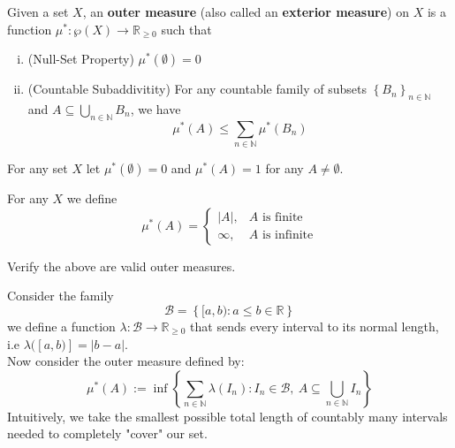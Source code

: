 \documentclass[11pt,x11names]{article}
\newcommand{\nn}{\mathbb{N}}
\newcommand{\rr}{\mathbb{R}}
\newcommand{\calb}{\mathcal{B}}
\newcommand{\set}[1]{\left\{ #1 \right\}}
\newcommand{\abs}[1]{\left| #1 \right|}
\begin{document}
\begin{defn}
Given a set $X$, an \textbf{outer measure} (also called an \textbf{exterior measure}) on $X$ is a function $\mu^*: \wp(X) \to \rr_{\geq 0}$ such that 
\begin{enumerate}[(i)]
    \item (Null-Set Property) $\mu^*(\emptyset) = 0$
    \item (Countable Subaddivitity) For any countable family of subsets $\set{B_n}_{n \in \nn}$ and $A \subseteq \bigcup_{n \in \nn} B_n$, we have
    \begin{equation*}
        \mu^*(A) \leq \sum_{n \in \nn} \mu^*(B_n)
    \end{equation*}
\end{enumerate}
\end{defn}

\begin{example}
For any set $X$ let $\mu^*(\emptyset) = 0$ and $\mu^*(A) = 1$ for any $A \neq \emptyset$.
\end{example}

\begin{example}
For any $X$ we define
\begin{equation*}
    \mu^*(A) = \begin{cases}
        \abs{A}, & A \text{ is finite}\\
        \infty, & A \text{ is infinite}
    \end{cases}
\end{equation*}
\end{example}

\begin{sanitycheck}
    Verify the above are valid outer measures.
\end{sanitycheck}

\begin{example}[Outer Measure on $\rr$]
\label{Outer measure on R}
Consider the family 
\begin{equation*}
    \calb = \set{[a, b) : a \leq b \in \rr}
\end{equation*}
we define a function $\lambda: \calb \to \rr_{\geq 0}$ that sends every interval to its normal length, i.e $\lambda([a, b)] = \abs{b-a}$.\\
Now consider the outer measure defined by:
\begin{equation*}
    \mu^*(A) := \inf \set{\sum_{n \in \nn} \lambda(I_n) : I_n \in \calb, \ A \subseteq \bigcup_{n \in \nn} I_n}
\end{equation*}
Intuitively, we take the smallest possible total length of countably many intervals needed to completely "cover" our set.
\end{example}
\end{document}
